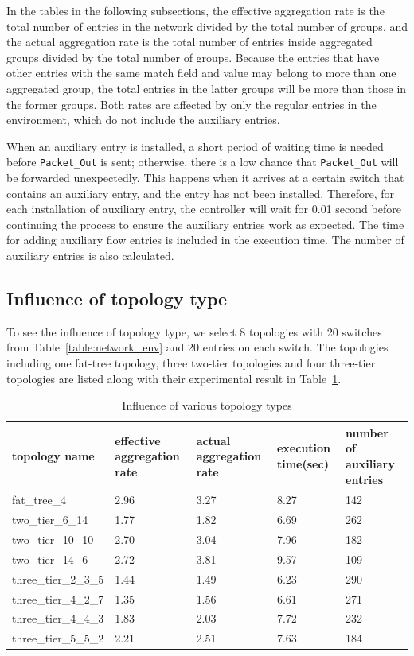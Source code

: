 In the tables in the following subsections, the effective aggregation rate is the total number of entries in the network divided by the total number of groups, and the actual aggregation rate is the total number of entries inside aggregated groups divided by the total number of groups. Because the entries that have other entries with the same match field and value may belong to more than one aggregated group, the total entries in the latter groups will be more than those in the former groups. Both rates are affected by only the regular entries in the environment, which do not include the auxiliary entries.

When an auxiliary entry is installed, a short period of waiting time is needed before \texttt{Packet\_Out} is sent; otherwise, there is a low chance that \texttt{Packet\_Out} will be forwarded unexpectedly. This happens when it arrives at a certain switch that contains an auxiliary entry, and the entry has not been installed. Therefore, for each installation of auxiliary entry, the controller will wait for 0.01 second before continuing the process to ensure the auxiliary entries work as expected. The time for adding auxiliary flow entries is included in the execution time. The number of auxiliary entries is also calculated.

\subsection{Influence of topology type}
To see the influence of topology type, we select 8 topologies with 20 switches from Table~\ref{table:network_env} and 20 entries on each switch. The topologies including one fat-tree topology, three two-tier topologies and four three-tier topologies are listed along with their experimental result in Table~\ref{table:different_topo_type}. 

\begin{table}
\centering
\caption{Influence of various topology types}
\begin{tabular}{|l|p{2.5cm}|p{2.5cm}|p{1.9cm}|p{2.8cm}|}
\hline topology name & effective aggregation rate & actual aggregation rate & execution time(sec) & number of auxiliary entries \\
\hline
\hline fat\_tree\_4 & 2.96 & 3.27 & 8.27 & 142 \\
\hline two\_tier\_6\_14 & 1.77 & 1.82 & 6.69 & 262 \\ 
\hline two\_tier\_10\_10 & 2.70 & 3.04 & 7.96 & 182 \\
\hline two\_tier\_14\_6 & 2.72 & 3.81 & 9.57 & 109 \\ 
\hline three\_tier\_2\_3\_5 & 1.44 & 1.49 & 6.23 & 290 \\
\hline three\_tier\_4\_2\_7 & 1.35 & 1.56 & 6.61 & 271 \\
\hline three\_tier\_4\_4\_3 & 1.83 & 2.03 & 7.72 & 232 \\
\hline three\_tier\_5\_5\_2 & 2.21 & 2.51 & 7.63 & 184 \\
\hline
\end{tabular}
\label{table:different_topo_type}
\end{table}

